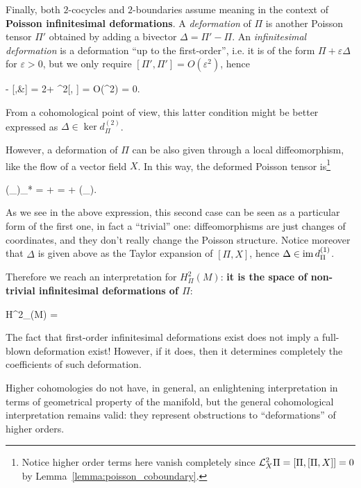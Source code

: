 \documentclass[main.tex]{subfiles}
\begin{document}
Finally, both $2$-cocycles and $2$-boundaries assume meaning in the context of \textbf{Poisson infinitesimal deformations}. A \emph{deformation} of $\Pi$ is another Poisson tensor $\Pi'$ obtained by adding a bivector $\Delta = \Pi' - \Pi$. An \emph{infinitesimal deformation} is a deformation ``up to the first-order'', i.e. it is of the form $\Pi + \varepsilon \Delta$ for $\varepsilon > 0$, but we only require $[\Pi', \Pi'] = O(\varepsilon^2)$, hence
\begin{eqalign}
	[\Pi + \varepsilon \Delta, \Pi + \varepsilon\Delta] - [\Pi,&\Pi] = 2\varepsilon[\Pi,\Delta] + \varepsilon^2[\Delta, \Delta] = O(\varepsilon^2) \iff [\Pi, \Delta] = 0.
\end{eqalign}
From a cohomological point of view, this latter condition might be better expressed as $\Delta \in \ker d_\Pi^{(2)}$.

However, a deformation of $\Pi$ can be also given through a local diffeomorphism, like the flow of a vector field $X$. In this way, the deformed Poisson tensor is\footnote{Notice higher order terms here vanish completely since $\mathcal{L}_{X}^2\Pi = [\Pi, [\Pi, X]] = 0$ by Lemma~\ref{lemma:poisson_coboundary}.}
\begin{eqalign}
	(\phi_\varepsilon)_* \Pi = \Pi + \varepsilon {}\Pi = \Pi + \varepsilon (_\Delta).
\end{eqalign}
As we see in the above expression, this second case can be seen as a particular form of the first one, in fact a ``trivial'' one: diffeomorphisms are just changes of coordinates, and they don't really change the Poisson structure. Notice moreover that $\Delta$ is given above as the Taylor expansion of $[\Pi, X]$, hence $\Delta \in \operatorname{im} d^{(1)}_\Pi$.

Therefore we reach an interpretation for $H_\Pi^2(M)$: \textbf{it is the space of non-trivial infinitesimal deformations of $\Pi$}:
\begin{eqalign}
	H^2_\Pi(M) = 
\end{eqalign}

\begin{remark}
	The fact that first-order infinitesimal deformations exist does not imply a full-blown deformation exist! However, if it does, then it determines completely the coefficients of such deformation.
\end{remark}

Higher cohomologies do not have, in general, an enlightening interpretation in terms of geometrical property of the manifold, but the general cohomological interpretation remains valid: they represent obstructions to ``deformations'' of higher orders.
\end{document}
